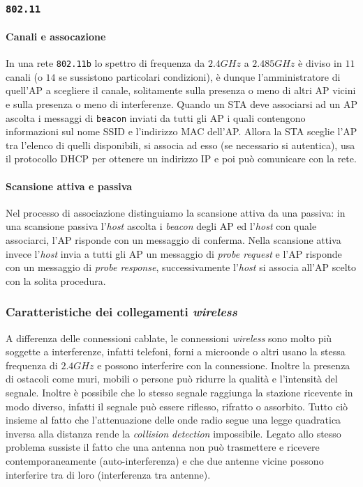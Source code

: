         \subsubsection{\texttt{802.11}}
            \paragraph{Canali e assocazione} In una rete \texttt{802.11b} lo spettro di frequenza da $2.4GHz$ a $2.485GHz$ è diviso in $11$ canali (o $14$ se sussistono particolari condizioni), è dunque l'amministratore di quell'\Acrshort*{AP} a scegliere il canale, solitamente sulla presenza o meno di altri \Acrshort*{AP} vicini e sulla presenza o meno di interferenze. Quando un \Acrshort*{STA} deve associarsi ad un \Acrshort*{AP} ascolta i messaggi di \texttt{beacon} inviati da tutti gli \Acrshort*{AP} i quali contengono informazioni sul nome \acrfull*{SSID} e l'indirizzo \Acrshort*{MAC} dell'\Acrshort*{AP}. Allora la \Acrshort*{STA} sceglie l'\Acrshort*{AP} tra l'elenco di quelli disponibili, si associa ad esso (se necessario si autentica), usa il protocollo \Acrshort*{DHCP} per ottenere un indirizzo \Acrshort*{IP} e poi può comunicare con la rete.
            \paragraph{Scansione attiva e passiva} Nel processo di associazione distinguiamo la scansione attiva da una passiva: in una scansione passiva l'\textit{host} ascolta i \textit{beacon} degli \Acrshort*{AP} ed l'\textit{host} con quale associarci, l'\Acrshort*{AP} risponde con un messaggio di conferma. Nella scansione attiva invece l'\textit{host} invia a tutti gli \Acrshort*{AP} un messaggio di \textit{probe request} e l'\Acrshort*{AP} risponde con un messaggio di \textit{probe response}, successivamente l'\textit{host} si associa all'\Acrshort*{AP} scelto con la solita procedura.
        \subsubsection{Caratteristiche dei collegamenti \textit{wireless}}
            A differenza delle connessioni cablate, le connessioni \textit{wireless} sono molto più soggette a interferenze, infatti telefoni, forni a microonde o altri usano la stessa frequenza di $2.4GHz$ e possono interferire con la connessione. Inoltre la presenza di ostacoli come muri, mobili o persone può ridurre la qualità e l'intensità del segnale. Inoltre è possibile che lo stesso segnale raggiunga la stazione ricevente in modo diverso, infatti il segnale può essere riflesso, rifratto o assorbito.\newline
            Tutto ciò insieme al fatto che l'attenuazione delle onde radio segue una legge quadratica inversa alla distanza rende la \textit{collision detection} impossibile. Legato allo stesso problema sussiste il fatto che una antenna non può trasmettere e ricevere contemporaneamente (auto-interferenza) e che due antenne vicine possono interferire tra di loro (interferenza tra antenne).
